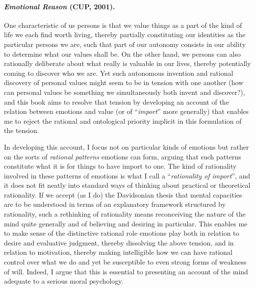 \documentclass[%
  11pt,%
]{article}
\begin{document}
\paragraph{\emph{Emotional Reason} (CUP, 2001).}

One characteristic of us persons is that we value things as a part of the kind of life we each find worth living, thereby partially constituting our identities as the particular persons we are, such that part of our autonomy consists in our ability to determine what our values shall be. On the other hand, we persons can also rationally deliberate about what really is valuable in our lives, thereby potentially coming to discover who we are. Yet such autonomous invention and rational discovery of personal values might seem to be in tension with one another (how can personal values be something we simultaneously both invent and discover?), and this book aims to resolve that tension by developing an account of the relation between emotions and value (or of \enquote{\emph{import}} more generally) that enables me to reject the rational and ontological priority implicit in this formulation of the tension.

In developing this account, I focus not on particular kinds of emotions but rather on the sorts of \emph{rational patterns} emotions can form, arguing that such patterns constitute what it is for things to have import to one. The kind of rationality involved in these patterns of emotions is what I call a \enquote{\emph{rationality of import}}, and it does not fit neatly into standard ways of thinking about practical or theoretical rationality. If we accept (as I do) the Davidsonian thesis that mental capacities are to be understood in terms of an explanatory framework structured by rationality, such a rethinking of rationality means reconceiving the nature of the mind quite generally and of believing and desiring in particular. This enables me to make sense of the distinctive rational role emotions play both in relation to desire and evaluative judgment, thereby dissolving the above tension, and in relation to motivation, thereby making intelligible how we can have rational control over what we do and yet be susceptible to even strong forms of weakness of will. Indeed, I argue that this is essential to presenting an account of the mind adequate to a serious moral psychology.

\end{document}
